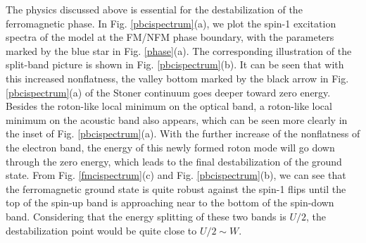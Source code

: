\documentclass[amsmath,superscriptaddress,showpacs,aps,prb,twocolumn]{revtex4-1}
\begin{document}
\par The physics discussed above is essential for the destabilization of the ferromagnetic phase. In Fig. \ref{pbcispectrum}(a), we plot the spin-1 excitation spectra of the model at the FM/NFM phase boundary, with the parameters marked by the blue star in Fig. \ref{phase}(a). The corresponding illustration of the split-band picture is shown in Fig. \ref{pbcispectrum}(b). It can be seen that with this increased nonflatness, the valley bottom marked by the black arrow in Fig. \ref{pbcispectrum}(a) of the Stoner continuum goes deeper toward zero energy. Besides the roton-like local minimum on the optical band, a roton-like local minimum on the acoustic band also appears, which can be seen more clearly in the inset of Fig. \ref{pbcispectrum}(a). With the further increase of the nonflatness of the electron band, the energy of this newly formed roton mode will go down through the zero energy, which leads to the final destabilization of the ground state. From Fig. \ref{fmcispectrum}(c) and Fig. \ref{pbcispectrum}(b), we can see that the ferromagnetic ground state is quite robust against the spin-1 flips until the top of the spin-up band is approaching near to the bottom of the spin-down band. Considering that the energy splitting of these two bands is $U/2$, the destabilization point would be quite close to $U/2\sim W$.
\end{document}
